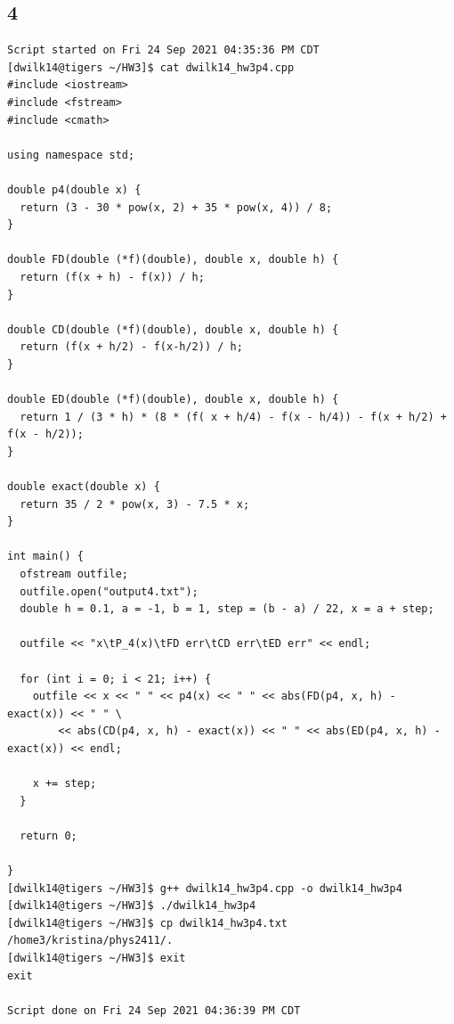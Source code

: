 \documentclass{article}
\begin{document}
\subsection*{4}
\begin{verbatim}
Script started on Fri 24 Sep 2021 04:35:36 PM CDT
[dwilk14@tigers ~/HW3]$ cat dwilk14_hw3p4.cpp
#include <iostream>
#include <fstream>
#include <cmath>

using namespace std;

double p4(double x) {
  return (3 - 30 * pow(x, 2) + 35 * pow(x, 4)) / 8;
}

double FD(double (*f)(double), double x, double h) {
  return (f(x + h) - f(x)) / h;
}

double CD(double (*f)(double), double x, double h) {
  return (f(x + h/2) - f(x-h/2)) / h;
}

double ED(double (*f)(double), double x, double h) {
  return 1 / (3 * h) * (8 * (f( x + h/4) - f(x - h/4)) - f(x + h/2) + f(x - h/2));
}

double exact(double x) {
  return 35 / 2 * pow(x, 3) - 7.5 * x;
}

int main() {
  ofstream outfile;
  outfile.open("output4.txt");
  double h = 0.1, a = -1, b = 1, step = (b - a) / 22, x = a + step;

  outfile << "x\tP_4(x)\tFD err\tCD err\tED err" << endl;

  for (int i = 0; i < 21; i++) {
    outfile << x << " " << p4(x) << " " << abs(FD(p4, x, h) - exact(x)) << " " \
        << abs(CD(p4, x, h) - exact(x)) << " " << abs(ED(p4, x, h) - exact(x)) << endl;

    x += step;
  }

  return 0;

}
[dwilk14@tigers ~/HW3]$ g++ dwilk14_hw3p4.cpp -o dwilk14_hw3p4
[dwilk14@tigers ~/HW3]$ ./dwilk14_hw3p4
[dwilk14@tigers ~/HW3]$ cp dwilk14_hw3p4.txt /home3/kristina/phys2411/.
[dwilk14@tigers ~/HW3]$ exit
exit

Script done on Fri 24 Sep 2021 04:36:39 PM CDT

\end{verbatim}
\end{document}
